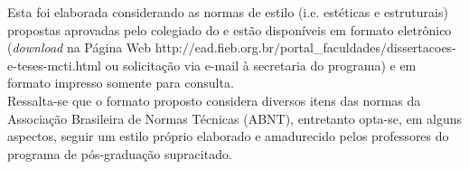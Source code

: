 
\begin{notaestilo}
Esta \thetypeworkthree foi elaborada considerando as normas de
estilo (i.e. est\'eticas e estruturais) propostas aprovadas pelo
colegiado do \thefacultytwo e est\~ao dispon\'iveis em formato
eletr\^onico ({\it download} na P\'agina Web
http:$//$ead.fieb.org.br$/$portal\_faculdades$/$dissertacoes-e-teses-mcti.html
ou solicita\c{c}\~ao via e-mail \`a secretaria do
programa) e em formato impresso somente para consulta. \\

Ressalta-se que o formato proposto considera diversos itens das
normas da Associa\c{c}\~ao Brasileira de Normas T\'ecnicas (ABNT),
entretanto opta-se, em alguns aspectos, seguir um estilo pr\'oprio
elaborado e amadurecido pelos professores do programa de
p\'os-gradua\c{c}\~ao supracitado.

\end{notaestilo}
